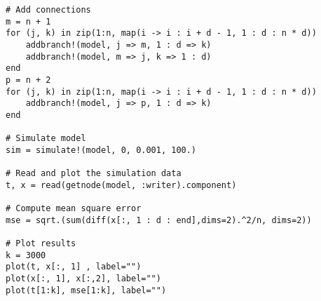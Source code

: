\begin{lstlisting}
# Add connections
m = n + 1
for (j, k) in zip(1:n, map(i -> i : i + d - 1, 1 : d : n * d))
    addbranch!(model, j => m, 1 : d => k)
    addbranch!(model, m => j, k => 1 : d)
end
p = n + 2
for (j, k) in zip(1:n, map(i -> i : i + d - 1, 1 : d : n * d))
    addbranch!(model, j => p, 1 : d => k)
end

# Simulate model 
sim = simulate!(model, 0, 0.001, 100.)

# Read and plot the simulation data 
t, x = read(getnode(model, :writer).component)

# Compute mean square error
mse = sqrt.(sum(diff(x[:, 1 : d : end],dims=2).^2/n, dims=2))

# Plot results
k = 3000 
plot(t, x[:, 1] , label="")
plot(x[:, 1], x[:,2], label="")
plot(t[1:k], mse[1:k], label="")
\end{lstlisting}